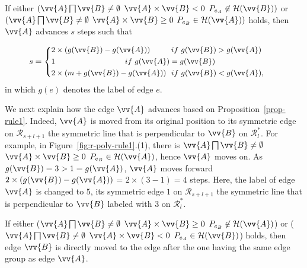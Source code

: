 \begin{prop}
\label{prop-rule1}
If either $(\vv{A} \bigsqcap \vv{B} \ne \emptyset$ \And $\vv{A} \times \vv{B} < 0$ \And $P_{e_A} \not \in \mathcal{H}(\vv{B}))$ or $(\vv{A} \bigsqcap \vv{B} \ne \emptyset$ \And $\vv{A} \times \vv{B} \ge 0$ \And $P_{e_B} \in \mathcal{H}(\vv{A}))$ holds, then $\vv{A}$ advances $s$ steps such that

\vspace{-1ex}
\begin{equation*}
\label{equ-rule1}
\small
    \hspace{2ex} s =  \left\{
    \begin{aligned}
        & 2\times(g(\vv{B}) - g(\vv{A}))  \hspace{5ex}~~if  ~g(\vv{B}) > g(\vv{A}) \\
        & {1}              \hspace{21ex}~if  ~g(\vv{A}) = g(\vv{B}) \\
        & 2\times(m+g(\vv{B}) - g(\vv{A})) ~~if  ~g(\vv{B}) < g(\vv{A}), \\
    \end{aligned}
    \right.       \hspace{6ex}{}
\end{equation*}
in which $g(e)$ denotes the label of edge $e$.
\end{prop}




We next explain how the edge $\vv{A}$ advances based on Proposition~\ref{prop-rule1}.
Indeed, $\vv{A}$ is moved from its original position to its symmetric edge on $\mathcal{R}_{s+l+1}$ \wrt the symmetric line that is perpendicular to $\vv{B}$  on $\mathcal{R}^*_{l}$.
For example, in Figure~\ref{fig:r-poly-rule1}.(1), there is $\vv{A} \bigsqcap \vv{B} \ne \emptyset$ \And $\vv{A} \times \vv{B} \ge 0$ \And $P_{e_B} \in \mathcal{H}(\vv{A})$, hence $\vv{A}$ moves on. As $g(\vv{B})=3 > 1=g(\vv{A})$, $\vv{A}$ moves forward $2\times(g(\vv{B}) - g(\vv{A}))$ = $2\times(3-1)= 4$ steps.
Here, the label of edge $\vv{A}$ is changed to $5$, its symmetric edge $1$ on $\mathcal{R}_{s+l+1}$ \wrt the symmetric line that is perpendicular to $\vv{B}$ labeled with $3$  on $\mathcal{R}^*_{l}$.



\begin{prop}
\label{prop-rule2}
If either ($\vv{A} \bigsqcap \vv{B} \ne \emptyset$ \And $\vv{A} \times \vv{B} \ge 0$ \And $P_{e_B} \not \in \mathcal{H}(\vv{A})$) or ($\vv{A} \bigsqcap \vv{B} \ne \emptyset$ \And $\vv{A} \times \vv{B} < 0$ \And $P_{e_A} \in \mathcal{H}(\vv{B})$) holds, then edge $\vv{B}$ is directly moved to the edge after the one having the same edge group as edge $\vv{A}$.
\end{prop}

